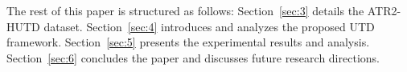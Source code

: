 The rest of this paper is structured as follows:  
Section~\ref{sec:3} details the ATR2-HUTD dataset.  
Section~\ref{sec:4} introduces and analyzes the proposed UTD framework.  
Section~\ref{sec:5} presents the experimental results and analysis.  
Section~\ref{sec:6} concludes the paper and discusses future research directions.  
